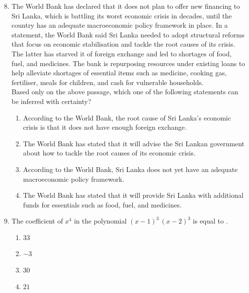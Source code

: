 \documentclass[journal]{IEEEtran}
\theoremstyle{remark}
\begin{document}
\begin{enumerate}[itemsep=1em]
\setcounter{enumi}{7}
\item 
The World Bank has declared that it does not plan to offer new financing to Sri Lanka, which is battling its worst economic crisis in decades, until the country has an adequate macroeconomic policy framework in place. In a statement, the World Bank said Sri Lanka needed to adopt structural reforms that focus on economic stabilisation and tackle the root causes of its crisis. The latter has starved it of foreign exchange and led to shortages of food, fuel, and medicines. The bank is 
repurposing resources under existing loans to help alleviate shortages of essential items such as medicine, cooking gas, fertiliser, meals for children, and cash for vulnerable households. \\
 
Based only on the above passage, which one of the following statements can be inferred with certainty? 

\begin{enumerate}[leftmargin=2.5em, labelsep=0.5em, itemsep=0.5em]
   \item According to the World Bank, the root cause of Sri Lanka's economic crisis is that it does not have enough foreign exchange. 
   \item The World Bank has stated that it will advise the Sri Lankan government about how to tackle the root causes of its economic crisis. 
   \item According to the World Bank, Sri Lanka does not yet have an adequate macroeconomic policy framework. 
   \item The World Bank has stated that it will provide Sri Lanka with additional funds for essentials such as food, fuel, and medicines. 
\end{enumerate}
\end{enumerate}
\newpage
\vspace*{0.25cm}
\begin{enumerate}[itemsep=1em]
\setcounter{enumi}{8}
\item The coefficient of $x^4$ in the polynomial $(x-1)^3\,(x-2)^3$ is equal to \underline{\hspace{1cm}}. 
\begin{multicols}{4}
\begin{enumerate}
     \item $33$
     \item $-3$
     \item $30$
     \item $21$
\end{enumerate}
\end{multicols}
\end{enumerate}
\end{document}
